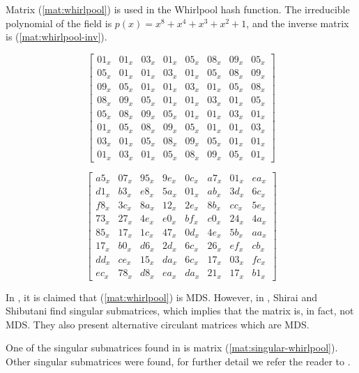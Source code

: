 Matrix (\ref{mat:whirlpool}) is used in the Whirlpool hash function. The irreducible polynomial of the field is $p(x) = x^8+x^4+x^3+x^2+1$, and the inverse matrix is (\ref{mat:whirlpool-inv}).

\begin{equation}\label{mat:whirlpool}
\begin{bmatrix}
01_x & 01_x & 03_x & 01_x & 05_x & 08_x & 09_x & 05_x\\
05_x & 01_x & 01_x & 03_x & 01_x & 05_x & 08_x & 09_x\\
09_x & 05_x & 01_x & 01_x & 03_x & 01_x & 05_x & 08_x\\
08_x & 09_x & 05_x & 01_x & 01_x & 03_x & 01_x & 05_x\\
05_x & 08_x & 09_x & 05_x & 01_x & 01_x & 03_x & 01_x\\
01_x & 05_x & 08_x & 09_x & 05_x & 01_x & 01_x & 03_x\\
03_x & 01_x & 05_x & 08_x & 09_x & 05_x & 01_x & 01_x\\
01_x & 03_x & 01_x & 05_x & 08_x & 09_x & 05_x & 01_x
\end{bmatrix}
\end{equation}

\begin{equation}\label{mat:whirlpool-inv}
\begin{bmatrix}
a5_x & 07_x & 95_x & 9e_x & 0c_x & a7_x & 01_x & ea_x\\
d1_x & b3_x & e8_x & 5a_x & 01_x & ab_x & 3d_x & 6c_x\\
f8_x & 3c_x & 8a_x & 12_x & 2e_x & 8b_x & cc_x & 5e_x\\
73_x & 27_x & 4e_x & e0_x & bf_x & c0_x & 24_x & 4a_x\\
85_x & 17_x & 1c_x & 47_x & 0d_x & 4e_x & 5b_x & aa_x\\
17_x & b0_x & d6_x & 2d_x & 6c_x & 26_x & ef_x & cb_x\\
dd_x & ce_x & 15_x & da_x & 6c_x & 17_x & 03_x & fc_x\\
ec_x & 78_x & d8_x & ea_x & da_x & 21_x & 17_x & b1_x
\end{bmatrix}
\end{equation}

In \cite{Whirlpool2003}, it is claimed that (\ref{mat:whirlpool}) is MDS. However, in \cite{Shirai2003}, Shirai and Shibutani find singular submatrices, which implies that the matrix is, in fact, not MDS. They also present alternative circulant matrices which are MDS.

One of the singular submatrices found in \cite{Shirai2003} is matrix (\ref{mat:singular-whirlpool}). Other singular submatrices were found, for further detail we refer the reader to \cite{Shirai2003}.

